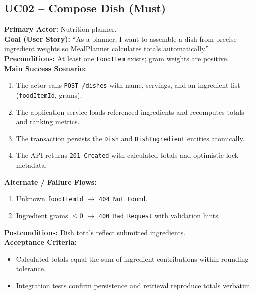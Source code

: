 \documentclass[11pt]{article}
\begin{document}
\subsection*{UC02 -- Compose Dish (Must)}
\textbf{Primary Actor:} Nutrition planner.\\
\textbf{Goal (User Story):} ``As a planner, I want to assemble a dish from precise ingredient weights so MealPlanner calculates totals automatically.''\\
\textbf{Preconditions:} At least one \texttt{FoodItem} exists; gram weights are positive.\\
\textbf{Main Success Scenario:}
\begin{enumerate}[label=\arabic*.]
  \item The actor calls \texttt{POST /dishes} with name, servings, and an ingredient list (\texttt{foodItemId}, grams).
  \item The application service loads referenced ingredients and recomputes totals and ranking metrics.
  \item The transaction persists the \texttt{Dish} and \texttt{DishIngredient} entities atomically.
  \item The API returns \texttt{201 Created} with calculated totals and optimistic-lock metadata.
\end{enumerate}
\textbf{Alternate / Failure Flows:}
\begin{enumerate}[label=\arabic*F.]
  \item Unknown \texttt{foodItemId} $\rightarrow$ \texttt{404 Not Found}.
  \item Ingredient grams $\leq 0$ $\rightarrow$ \texttt{400 Bad Request} with validation hints.
\end{enumerate}
\textbf{Postconditions:} Dish totals reflect submitted ingredients.\\
\textbf{Acceptance Criteria:}
\begin{itemize}[noitemsep]
  \item Calculated totals equal the sum of ingredient contributions within rounding tolerance.
  \item Integration tests confirm persistence and retrieval reproduce totals verbatim.
\end{itemize}
\end{document}

